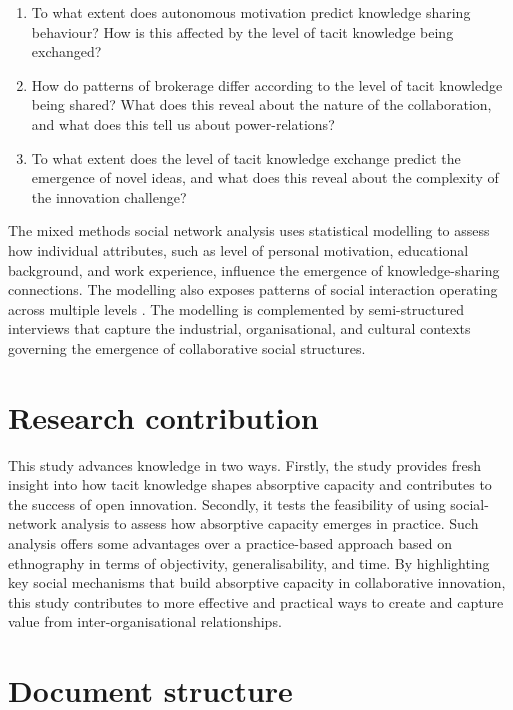 {{\begin{enumerate}
	\item To what extent does autonomous motivation predict knowledge sharing behaviour? How is this affected by the level of tacit knowledge being exchanged?
	\item How do patterns of brokerage differ according to the level of tacit knowledge being shared? What does this reveal about the nature of the collaboration, and what does this tell us about power-relations?
	\item To what extent does the level of tacit knowledge exchange predict the emergence of novel ideas, and what does this reveal about the complexity of the innovation challenge? 
\end{enumerate}

The mixed methods social network analysis uses statistical modelling to assess how individual attributes, such as level of personal motivation, educational background, and work experience, influence the emergence of knowledge-sharing connections. The modelling also exposes patterns of social interaction operating across multiple levels \citep{monge2003theories,lusher2012exponential}. The modelling is complemented by semi-structured interviews that capture the industrial, organisational, and cultural contexts governing the emergence of collaborative social structures.\medskip 

\section{Research contribution}

This study advances knowledge in two ways. Firstly, the study provides fresh insight into how tacit knowledge shapes absorptive capacity and contributes to the success of open innovation. Secondly, it tests the feasibility of using social-network analysis to assess how absorptive capacity emerges in practice. Such analysis offers some advantages over a practice-based approach based on ethnography in terms of objectivity, generalisability, and time. By highlighting key social mechanisms that build absorptive capacity in collaborative innovation, this study contributes to more effective and practical ways to create and capture value from inter-organisational relationships.\medskip

\section{Document structure}

}}
